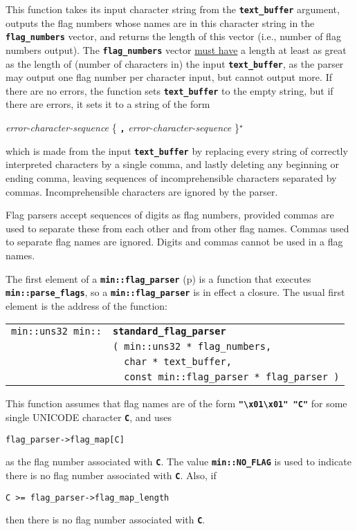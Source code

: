 \documentclass[12pt]{article}
\makeatletter
\newcommand{\TT}[1]{{\tt \bfseries #1}}
\newcommand{\STAR}{{\Large $^\star$}}
\newcommand{\ttindex}[1]{\index{#1@{\tt #1}}}
\newcommand{\pagref}[1]{p\pageref{#1}}
\newcommand{\EOL}{\penalty \exhyphenpenalty}
\newenvironment{indpar}[1][0.3in]%
	{\begin{list}{}%
		     {\setlength{\itemsep}{0in}%
		      \setlength{\topsep}{0in}%
		      \setlength{\parsep}{1ex}%
		      \setlength{\labelwidth}{#1}%
		      \setlength{\leftmargin}{#1}%
		      \addtolength{\leftmargin}{\labelsep}}%
	 \item}%
	{\end{list}}
\newcommand{\LABEL}[1]{\label{#1}}
\newlength{\ARGBREAKLENGTH}
\newcommand{\ARGBREAK}[1][\ARGBREAKLENGTH]{\\&\hspace*{#1}}
\newcommand{\MINKEY}[1]%
	   {\TT{#1}\ttindex{min::#1}\ttindex{#1}}
\makeatother
\begin{document}
This function takes its input character string from the \TT{text\_\EOL buffer}
argument, outputs the flag numbers whose names are in this character
string in the \TT{flag\_\EOL numbers} vector, and returns the length
of this vector (i.e., number of flag numbers output).
The \TT{flag\_\EOL numbers} vector \underline{must have}
a length
at least as great as the length of (number of characters in) the
input \TT{text\_\EOL buffer}, as the parser may output
one flag number per character input, but cannot output more.
If there are no errors, the function sets
\TT{text\_\EOL buffer} to the empty string, but if there are errors,
it sets it to a string of the form
\begin{center}
{\em error-character-sequence}
    \{ \TT{,} {\em error-character-sequence} \}\STAR{}
\end{center}
which is made from the input \TT{text\_\EOL buffer} by replacing
every string of correctly interpreted characters by a single comma,
and lastly deleting any beginning or ending comma,
leaving sequences of incomprehensible
characters separated by commas.  Incomprehensible characters are ignored
by the parser.

Flag parsers accept sequences of digits as flag numbers,
provided commas are used to separate these from each other and from other
flag names.  Commas used to separate flag names are ignored.
Digits and commas cannot be used in a flag names.

The first element of a \TT{min::flag\_parser}
(\pagref{MIN::FLAG_PARSER})
is a function that executes
\TT{min::\EOL parse\_\EOL flags}, so a \TT{min::flag\_\EOL parser}
is in effect a closure.  The usual first element is the address of
the function:

\begin{indpar}[1em]\begin{tabular}{r@{}l}
\verb|min::uns32 min::| & \MINKEY{standard\_flag\_parser}\ARGBREAK
    \verb|( min::uns32 * flag_numbers,|\ARGBREAK
    \verb|  char * text_buffer,|\ARGBREAK
    \verb|  const min::flag_parser * flag_parser )|
\LABEL{MIN::STANDARD_FLAG_PARSER} \\
\end{tabular}\end{indpar}

This function assumes that flag names are of the form
\TT{"\textbackslash x01\textbackslash x01" "C"} for some single
UNICODE character \TT{C}, and uses
\begin{center}
\verb|flag_parser->flag_map[C]|
\end{center}
as the flag number associated with \TT{C}.
The value \TT{min::\EOL NO\_\EOL FLAG} is used to indicate there
is no flag number associated with \TT{C}.  Also, if
\begin{center}
\verb|C >= flag_parser->flag_map_length|
\end{center}
then there is no flag number associated with \TT{C}.
\end{document}

